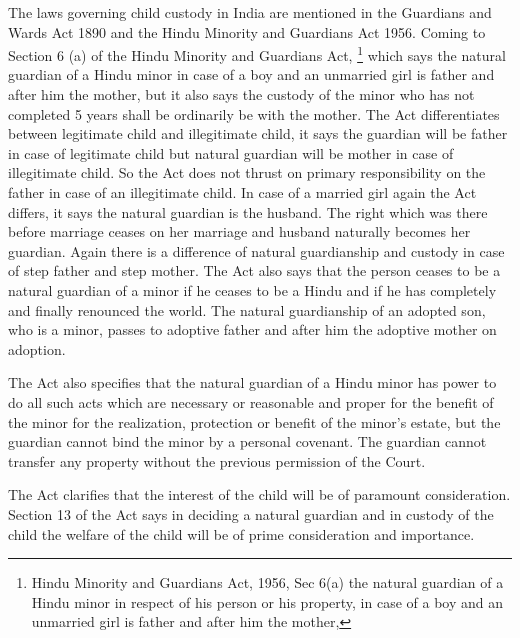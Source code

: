\begin{multicols}{2}
\noi
The laws governing child custody in India are mentioned in the Guardians and Wards Act 1890
and the Hindu Minority and Guardians Act 1956. Coming to Section 6 (a) of the Hindu Minority 
and Guardians Act, \footnote{Hindu Minority and Guardians Act, 1956, Sec 6(a) the natural guardian of a Hindu minor in respect of his person
or his property, in case of a boy and an unmarried girl is father and after him the mother,} which says the natural guardian of a Hindu minor in case of a boy and an
unmarried girl is father and after him the mother, but it also says the custody of the minor who
has not completed 5 years shall be ordinarily be with the mother. The Act differentiates between
legitimate child and illegitimate child, it says the guardian will be father in case of legitimate child
but natural guardian will be mother in case of illegitimate child. So the Act does not thrust on
primary responsibility on the father in case of an illegitimate child. In case of a married girl again
the Act differs, it says the natural guardian is the husband. The right which was there before
marriage ceases on her marriage and husband naturally becomes her guardian. Again there is a
difference of natural guardianship and custody in case of step father and step mother. The Act
also says that the person ceases to be a natural guardian of a minor if he ceases to be a Hindu and
if he has completely and finally renounced the world. The natural guardianship of an adopted son,
who is a minor, passes to adoptive father and after him the adoptive mother on adoption.

\noi
The Act also specifies that the natural guardian of a Hindu minor has power to do all such acts
which are necessary or reasonable and proper for the benefit of the minor for the realization,
protection or benefit of the minor’s estate, but the guardian cannot bind the minor by a personal
covenant. The guardian cannot transfer any property without the previous permission of the Court.

\noi
The Act clarifies that the interest of the child will be of paramount consideration. Section 13 of
the Act says in deciding a natural guardian and in custody of the child the welfare of the child
will be of prime consideration and importance.


\end{multicols}
